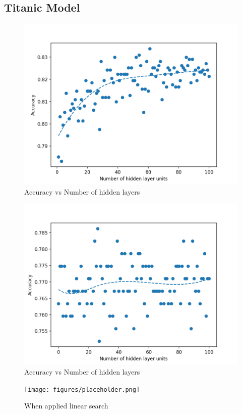 \documentclass[conference]{IEEEtran}
\begin{document}
\subsection{Titanic Model}

\begin{figure}[H]
    \centering
    \includegraphics[width=0.8\linewidth]{figures/drexelai_binary_search_train_acc_titanic.png}
    \setlength{\belowcaptionskip}{-15pt}
    \caption{Accuracy vs Number of hidden layers}
    \label{dnadigest}
\end{figure}


\begin{figure}[H]
    \centering
    \includegraphics[width=0.8\linewidth]{figures/drexelai_binary_search_test_acc_titanic.png}
    \setlength{\belowcaptionskip}{-15pt}
    \caption{Accuracy vs Number of hidden layers}
    \label{dnadigest}
\end{figure}


\begin{figure}[H]
    \centering
    \texttt{[image: figures/placeholder.png]}
    \setlength{\belowcaptionskip}{-15pt}
    \caption{When applied linear search}
    \label{dnadigest}
\end{figure}
\end{document}
